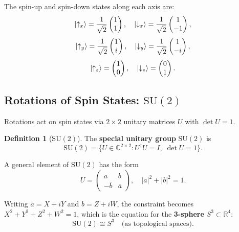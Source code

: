 \documentclass[11pt,a4paper]{article}
\theoremstyle{definition}
\newtheorem{definition}{Definition}[section]
\theoremstyle{plain}
\theoremstyle{remark}
\begin{document}
The spin-up and spin-down states along each axis are:
\[
    \ket{\uparrow_x} = \frac{1}{\sqrt{2}}\begin{pmatrix}1\\1\end{pmatrix}, \quad
    \ket{\downarrow_x} = \frac{1}{\sqrt{2}}\begin{pmatrix}1\\-1\end{pmatrix},
\]
\[
    \ket{\uparrow_y} = \frac{1}{\sqrt{2}}\begin{pmatrix}1\\i\end{pmatrix}, \quad
    \ket{\downarrow_y} = \frac{1}{\sqrt{2}}\begin{pmatrix}1\\-i\end{pmatrix},
\]
\[
    \ket{\uparrow_z} = \begin{pmatrix}1\\0\end{pmatrix}, \quad
    \ket{\downarrow_z} = \begin{pmatrix}0\\1\end{pmatrix}.
\]

\subsection{Rotations of Spin States: $\mathrm{SU}(2)$}

Rotations act on spin states via $2 \times 2$ unitary matrices $U$ with $\det U = 1$.

\begin{definition}[$\mathrm{SU}(2)$]
    The \textbf{special unitary group} $\mathrm{SU}(2)$ is
    \[
        \mathrm{SU}(2) = \{ U \in \mathbb{C}^{2\times 2} : U^\dagger U = I,\; \det U = 1 \}.
    \]
\end{definition}

A general element of $\mathrm{SU}(2)$ has the form
\[
    U = \begin{pmatrix} a & b \\ -\bar{b} & \bar{a} \end{pmatrix}, \quad |a|^2 + |b|^2 = 1.
\]

Writing $a = X + iY$ and $b = Z + iW$, the constraint becomes $X^2 + Y^2 + Z^2 + W^2 = 1$, which is the equation for the \textbf{3-sphere} $S^3 \subset \mathbb{R}^4$:
\[
    \mathrm{SU}(2) \cong S^3 \quad \text{(as topological spaces)}.
\]

\end{document}
